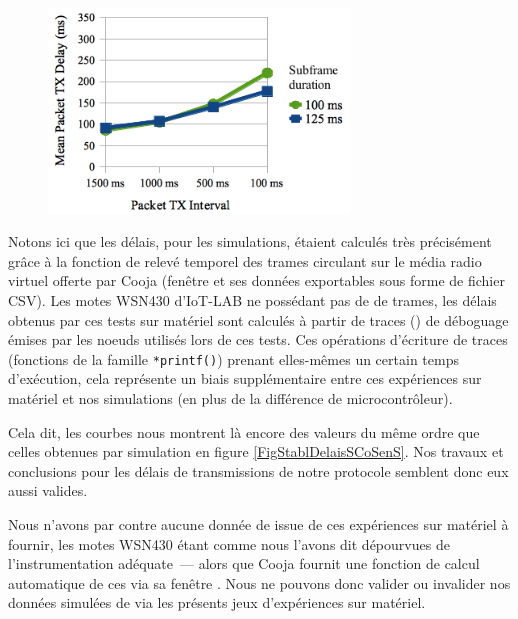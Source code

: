 \begin{figure}[htb]
\centering
\includegraphics[width=8cm]{images/ch5-delays-iot-lab.png}
\label{FigDelaisIoTLAB}
\end{figure}

Notons ici que les délais, pour les simulations, étaient calculés très
précisément grâce à la fonction de relevé temporel des trames circulant
sur le média radio virtuel offerte par Cooja (fenêtre  et ses données exportables sous forme de fichier CSV).
Les motes WSN430 d'IoT-LAB ne possédant pas de 
de trames, les délais obtenus par ces tests sur matériel sont calculés
à partir de traces () de déboguage émises par les noeuds
utilisés lors de ces tests. Ces opérations d'écriture de traces (fonctions
de la famille \texttt{*printf()}) prenant elles-mêmes un certain temps
d'exécution, cela représente un biais supplémentaire entre ces expériences
sur matériel et nos simulations (en plus de la différence de
microcontrôleur).

Cela dit, les courbes nous montrent là encore des valeurs du même ordre
que celles obtenues par simulation en figure \vref{FigStablDelaisSCoSenS}.
Nos travaux et conclusions pour les délais de transmissions de notre
protocole semblent donc eux aussi valides.

\medskip

Nous n'avons par contre aucune donnée de  issue de
ces expériences sur matériel à fournir, les motes WSN430 étant comme nous
l'avons dit dépourvues de l'instrumentation adéquate~--- alors que Cooja
fournit une fonction de calcul automatique de ces 
via sa fenêtre . Nous ne pouvons donc valider ou
invalider nos données simulées de  via les présents
jeux d'expériences sur matériel.

